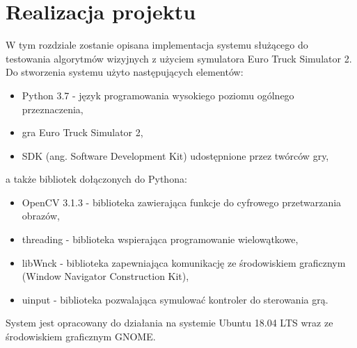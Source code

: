 \chapter{Realizacja projektu}
W tym rozdziale zostanie opisana implementacja systemu służącego do testowania algorytmów wizyjnych z użyciem symulatora Euro Truck Simulator 2. Do stworzenia systemu użyto następujących elementów:
\begin{itemize}
\item Python 3.7 - język programowania wysokiego poziomu ogólnego przeznaczenia,
\item gra Euro Truck Simulator 2,
\item SDK (ang. Software Development Kit) udostępnione przez twórców gry,
\end{itemize}
a także bibliotek dołączonych do Pythona:
\begin{itemize}
\item OpenCV 3.1.3 - biblioteka zawierająca funkcje do cyfrowego przetwarzania obrazów,
\item threading - biblioteka wspierająca programowanie wielowątkowe,
\item libWnck - biblioteka zapewniająca komunikację ze środowiskiem graficznym (Window Navigator Construction Kit),
\item uinput - biblioteka pozwalająca symulować kontroler do sterowania grą.
\end{itemize}

System jest opracowany do działania na systemie Ubuntu 18.04 LTS wraz ze środowiskiem graficznym GNOME.

